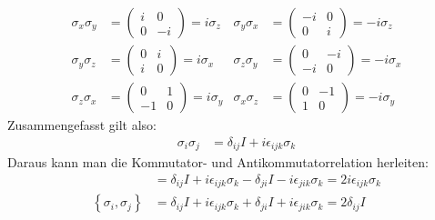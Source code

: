 \documentclass[a4paper,12pt]{article}
\newcommand{\klammer}{}
\begin{document}
\begin{align*}
\sigma_x\sigma_y&=\begin{pmatrix}
i & 0 \\ 0 & -i
\end{pmatrix}=i\sigma_z &\sigma_y\sigma_x&=\begin{pmatrix}
-i & 0 \\ 0 & i
\end{pmatrix}=-i\sigma_z \\
\sigma_y\sigma_z&=\begin{pmatrix}
0 & i \\ i & 0
\end{pmatrix}=i\sigma_x &\sigma_z\sigma_y&=\begin{pmatrix}
0 & -i \\ -i & 0
\end{pmatrix}=-i\sigma_x \\
\sigma_z\sigma_x&=\begin{pmatrix}
0 & 1 \\ -1 & 0
\end{pmatrix}=i\sigma_y &\sigma_x\sigma_z&=\begin{pmatrix}
0 & -1 \\ 1 & 0
\end{pmatrix}=-i\sigma_y
\end{align*}
Zusammengefasst gilt also:
\begin{align*}
\sigma_i\sigma_j&=\delta_{ij}I + i\epsilon_{ijk}\sigma_k
\end{align*}
Daraus kann man die Kommutator- und Antikommutatorrelation herleiten:
\begin{align*}
[\sigma_i,\sigma_j]&=\delta_{ij}I+i\epsilon_{ijk}\sigma_k-\delta_{ji}I-i\epsilon_{jik}\sigma_k=2i\epsilon_{ijk}\sigma_k \\
\klammer\left\{ {\sigma_i,\sigma_j} \right\}&=\delta_{ij}I+i\epsilon_{ijk}\sigma_k+\delta_{ji}I+i\epsilon_{jik}\sigma_k=2\delta_{ij}I
\end{align*}
\end{document}
